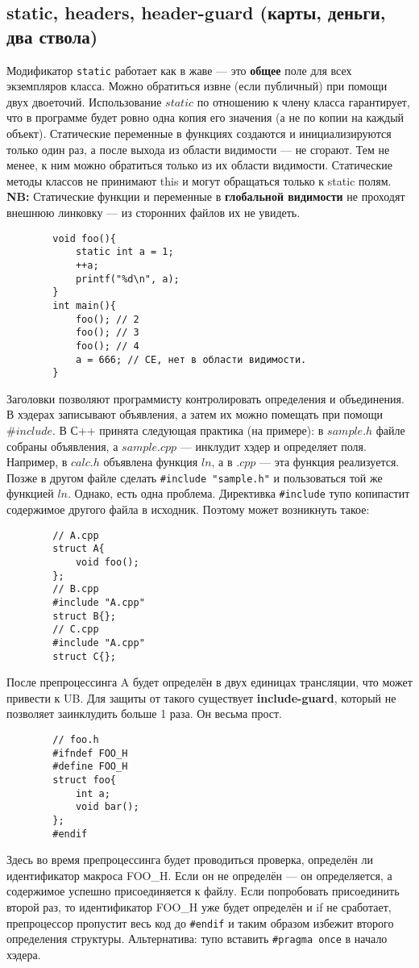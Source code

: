 \documentclass[15pt, a4paper]{article}
\newcommand{\nl}{\newline}
\begin{document}
    \subsection{static, headers, header-guard (карты, деньги, два ствола)}
    Модификатор \texttt{static} работает как в жаве --- это \textbf{общее} поле для всех экземпляров класса. Можно обратиться извне (если публичный) при помощи двух двоеточий.
    Использование $static$ по отношению к члену класса гарантирует, что в программе будет ровно одна копия его значения (а не по копии на каждый объект).
    Статические переменные в функциях создаются и инициализируются только один раз, а после выхода из области видимости --- не сгорают. Тем не менее, к ним можно обратиться только из их области видимости.
    Статические методы классов не принимают this и могут обращаться только к static полям. \nl
    \textbf{NB:} Статические функции и переменные в \textbf{глобальной видимости} не проходят внешнюю линковку --- из сторонних файлов их не увидеть.
    \begin{verbatim}
        void foo(){
            static int a = 1;
            ++a;
            printf("%d\n", a);
        }
        int main(){
            foo(); // 2
            foo(); // 3
            foo(); // 4
            a = 666; // CE, нет в области видимости.
        }
    \end{verbatim}
    Заголовки позволяют программисту контролировать определения и объединения. В хэдерах записывают объявления, а затем их можно помещать при помощи $\# include$.
    В С++ принята следующая практика (на примере): в $sample.h$ файле собраны объявления, а $sample.cpp$ --- инклудит хэдер и определяет поля. Например, в $calc.h$ объявлена
    функция $ln$, а в $.cpp$ --- эта функция реализуется. Позже в другом файле сделать \texttt{\#include "sample.h"} и пользоваться той же функцией $ln$. \nl 
    Однако, есть одна проблема. Директивка \texttt{\#include} тупо копипастит содержимое другого файла в исходник. Поэтому может возникнуть такое:
    \begin{verbatim}
        // A.cpp
        struct A{
            void foo();
        };
        // B.cpp
        #include "A.cpp"
        struct B{};
        // C.cpp
        #include "A.cpp"
        struct C{};
    \end{verbatim}
    После препроцессинга A будет определён в двух единицах трансляции, что может привести к UB. Для защиты от такого существует \textbf{include-guard}, который не позволяет заинклудить больше 1 раза. Он весьма прост.
    \begin{verbatim}
        // foo.h
        #ifndef FOO_H
        #define FOO_H
        struct foo{
            int a;
            void bar();
        };
        #endif
    \end{verbatim}
    Здесь во время препроцессинга будет проводиться проверка, определён ли идентификатор макроса FOO\_H. Если он не определён --- он определяется, а содержимое
    успешно присоединяется к файлу. Если попробовать присоединить второй раз, то идентификатор FOO\_H уже будет определён и if не сработает, препроцессор пропустит весь код до \texttt{\#endif}
    и таким образом избежит второго определения структуры. \nl
    Альтернатива: тупо вставить \texttt{\#pragma once} в начало хэдера.
\end{document}
